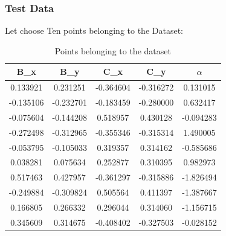 \documentclass{article}
\begin{document}
            \subsubsection{Test Data}

                Let choose Ten  points belonging to the Dataset: \\
                \begin{table}[h]
                    \centering
                    \begin{tabular}{|c|c|c|c|c|}
                    \hline
                    B\_x & B\_y & C\_x & C\_y & $\alpha$ \\
                    \hline
                    0.133921 & 0.231251 & -0.364604 & -0.316272 & 0.131015 \\
                    -0.135106 & -0.232701 & -0.183459 & -0.280000 & 0.632417 \\
                    -0.075604 & -0.144208 & 0.518957 & 0.430128 & -0.094283 \\
                    -0.272498 & -0.312965 & -0.355346 & -0.315314 & 1.490005 \\
                    -0.053795 & -0.105033 & 0.319357 & 0.314162 & -0.585686 \\
                    0.038281 & 0.075634 & 0.252877 & 0.310395 & 0.982973 \\
                    0.517463 & 0.427957 & -0.361297 & -0.315886 & -1.826494 \\
                    -0.249884 & -0.309824 & 0.505564 & 0.411397 & -1.387667 \\
                    0.166805 & 0.266332 & 0.296044 & 0.314060 & -1.156715 \\
                    0.345609 & 0.314675 & -0.408402 & -0.327503 & -0.028152 \\
                    \hline
                    \end{tabular}
                    \caption{Points belonging to the dataset}
                    \end{table}
            


            \newpage
\end{document}
